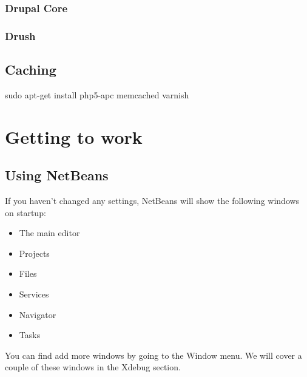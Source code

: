 \documentclass[ebook,10pt,twoside,openright]{memoir}
\begin{document}
\section{Drupal Core}

\section{Drush}

\chapter{Caching} \label{chcaching}

\begin{squashboxcommand}
sudo apt-get install php5-apc memcached varnish
\end{squashboxcommand}

\part{Getting to work}

\chapter{Using NetBeans} \label{chusingnetbeans}
\chapterprecis{}

If you haven’t changed any settings, NetBeans will show the following windows on startup:


\begin{itemize}
\item The main editor
\item Projects
\item Files
\item Services
\item Navigator
\item Tasks
\end{itemize}

You can find add more windows by going to the Window menu. We will cover a couple of these windows in the Xdebug section.
\end{document}
